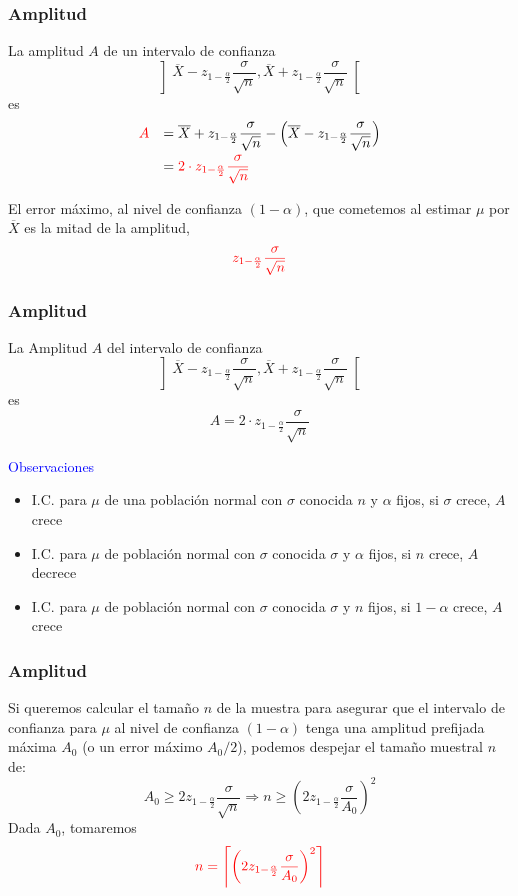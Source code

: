 \documentclass[12pt,t]{beamer}\usepackage[]{graphicx}\usepackage[]{color}
\newcommand{\red}[1]{\textcolor{red}{#1}}
\newcommand{\blue}[1]{\textcolor{blue}{#1}}
\renewcommand{\emph}[1]{{\color{red}#1}}
\renewcommand{\geq}{\geqslant}
\theoremstyle{plain}
\theoremstyle{definition}
\begin{document}
\begin{frame}
\frametitle{Amplitud}

La \emph{amplitud} $A$ de un intervalo de confianza  
$$
\left]\overline{X} -z_{1-\frac{\alpha}{2}} \frac{\sigma}{\sqrt{n}}, \overline{X}+z_{1-\frac{\alpha}{2}}\frac{\sigma}{\sqrt{n}}
\right[
$$
es
$$
\begin{array}{rl}
\red{A}& \displaystyle =\overline{X}+ z_{1-\frac{\alpha}{2}}\frac{\sigma}{\sqrt{n}}-\Big(\overline{X} -z_{1-\frac{\alpha}{2}}\frac{\sigma}{\sqrt{n}}\Big)\\[2ex] & \displaystyle =\red{2\cdot z_{1-\frac{\alpha}{2}}\frac{\sigma}{\sqrt{n}}}
\end{array}
$$

El \emph{error máximo}, al nivel de confianza  $(1-\alpha)$, que cometemos al estimar $\mu$
por  $\overline{X}$ es la mitad de la amplitud, 
$$
\red{z_{1-\frac{\alpha}{2}}\frac{\sigma}{\sqrt{n}}}
$$
\end{frame}

\begin{frame}
\frametitle{Amplitud}

La \emph{Amplitud} $A$ del intervalo de confianza 
$$
\left]\overline{X} -z_{1-\frac{\alpha}{2}} \frac{\sigma}{\sqrt{n}}, \overline{X}+z_{1-\frac{\alpha}{2}}\frac{\sigma}{\sqrt{n}}
\right[
$$
es
$$
A= 2\cdot z_{1-\frac{\alpha}{2}}\frac{\sigma}{\sqrt{n}}
$$

\blue{Observaciones}
\begin{itemize}
\item I.C. para $\mu$ de una población normal con $\sigma$ conocida $n$ y $\alpha$ fijos, si $\sigma$ crece,
 $A$ crece
\smallskip

\item I.C. para $\mu$ de población normal con $\sigma$ conocida $\sigma$ y $\alpha$ fijos, si $n$
crece,  $A$ decrece
\smallskip

\item I.C. para $\mu$ de población normal con $\sigma$ conocida $\sigma$ y $n$ fijos, si
$1-\alpha$ crece, $A$ crece
\end{itemize}
\end{frame}




\begin{frame}
\frametitle{Amplitud}

Si queremos calcular el   tamaño  $n$ de la muestra para asegurar que el intervalo de confianza  para $\mu$ al nivel de confianza $(1-\alpha)$ tenga una amplitud prefijada máxima $A_0$ (o un
error máximo $A_0/2$), podemos despejar el tamaño muestral  $n$ de:
$$
A_0\geq 2z_{1-\frac{\alpha}{2}}\frac{\sigma}{\sqrt{n}}\Rightarrow
n\geq \left( 2 z_{1-\frac{\alpha}{2}}\frac{\sigma}{A_0}
\right)^2
$$
Dada $A_0$, tomaremos
$$
\red{n=\left\lceil \left( 2 z_{1-\frac{\alpha}{2}}\frac{\sigma}{A_0}
\right)^2\right\rceil}
$$

\end{frame}
\end{document}
